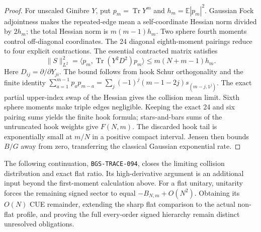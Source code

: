 \begin{proof}
For unscaled Ginibre $Y$, put $p_m=\operatorname{Tr}Y^m$ and
$h_m=\mathbb E|p_m|^2$. Gaussian Fock adjointness makes the repeated-edge
mean a self-coordinate Hessian norm divided by $2h_m$; the total Hessian
norm is $m(m-1)h_m$. Two sphere fourth moments control off-diagonal
coordinates. The 24 diagonal eighth-moment pairings reduce to four
explicit contractions. The essential contracted matrix satisfies
\[
 \|S\|_{L^2}^2=\langle p_m,\operatorname{Tr}(Y^2D^2)p_m\rangle
       \le m(N+m-1)h_m.
\]
Here $D_{ij}=\partial/\partial Y_{ji}$. The bound follows from hook Schur
orthogonality and the finite identity
$\sum_{a=1}^{m-1}p_ap_{m-a}
=\sum_j(-1)^j(m-1-2j)s_{(m-j,1^j)}$.
The exact partial upper-index swap of the Hessian gives the collision
mean limit. Sixth sphere moments make triple edges negligible.
Keeping the exact 24 and six pairing sums yields the finite hook formula;
stars-and-bars sums of the untruncated hook weights give $F(N,m)$.
The discarded hook tail is exponentially small at $m/N$ in a positive
compact interval. Jensen then bounds $B/G$ away from zero, transferring
the classical Gaussian exponential rate.
\end{proof}

The following continuation, \texttt{BGS-TRACE-094}, closes the limiting
collision distribution and exact flat ratio. Its high-derivative argument
is an additional input beyond the first-moment calculation above.
For a flat unitary, unitarity forces the remaining signed sector to equal
$-B_{N,m}+O(N^2)$. Obtaining its $O(N)$ CUE remainder, extending the sharp
flat comparison to the actual non-flat profile, and proving the full
every-order signed hierarchy remain distinct unresolved obligations.

